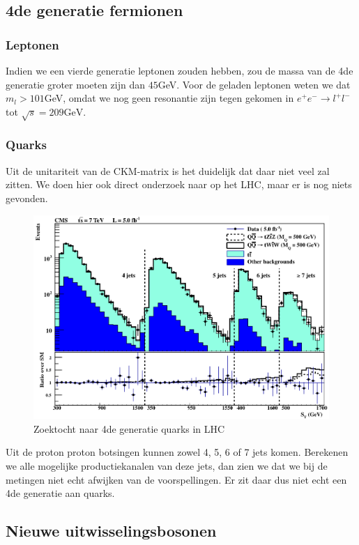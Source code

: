 \documentclass[../main.tex]{subfiles}
\begin{document}
\subsection{4de generatie fermionen}%
\label{sub:4de_generatie_fermionen}

\subsubsection{Leptonen}%
\label{ssub:leptonen}

Indien we een vierde generatie leptonen zouden hebben, zou de massa van de 4de generatie groter moeten zijn dan $45$GeV. Voor de geladen leptonen weten we dat $m_l > 101$GeV, omdat we nog geen resonantie zijn tegen gekomen in $e^{+} e^{-} \rightarrow l^{+} l^{-}$ tot $\sqrt{s}=209 \mathrm{GeV}$.

\subsubsection{Quarks}%
\label{ssub:quarks}

Uit de unitariteit van de CKM-matrix is het duidelijk dat daar niet veel zal zitten. We doen hier ook direct onderzoek naar op het LHC, maar er is nog niets gevonden.

\begin{figure}[h]
    \centering
    \includegraphics[width=0.6\linewidth]{physics_beyond_the_standard_model/lhc_4_gen_zoektocht.png}
    \caption{Zoektocht naar 4de generatie quarks in LHC}%
    \label{fig:physics_beyond_the_standard_model/lhc_4_gen_zoektocht}
\end{figure}

Uit de proton proton botsingen kunnen zowel 4, 5, 6 of 7 jets komen. Berekenen we alle mogelijke productiekanalen van deze jets, dan zien we dat we bij de metingen niet echt afwijken van de voorspellingen. Er zit daar dus niet echt een 4de generatie aan quarks.

\subsection{Nieuwe uitwisselingsbosonen}%
\label{sub:nieuwe_uitwisselings_bosonen}
\end{document}

